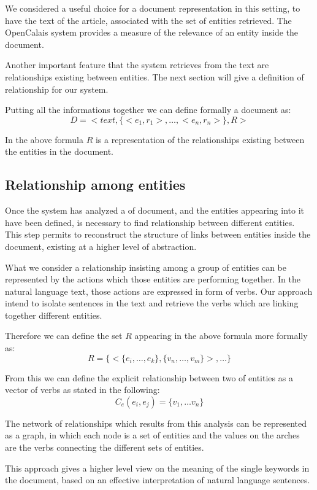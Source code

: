 \documentclass{acm_proc_article-sp-sigmod07}
\begin{document}
We considered a useful choice for a document representation in this
setting, to have the text of the article, associated with the set of
entities retrieved.
The OpenCalais system provides a measure of the relevance of an entity
inside the document.

Another important feature that the system retrieves from the text are
relationships existing between entities. The next section will give a
definition of relationship for our system.

Putting all the informations together we can define formally a document
as:
$$
D = <text, \{<e_{1},r_{1}>, \dots, <e_{n}, r_{n}>\}, R>
$$

In the above formula $R$ is a representation of the relationships
existing between the entities in the document.


\subsection{Relationship among entities}
Once the system has analyzed a of document, and the entities
appearing into it have been defined, is necessary to find relationship
between different entities. This step permits to reconstruct the structure
of links between entities inside the document, existing at a
higher level of abstraction.

What we consider a relationship insisting among a group of entities can be
represented by the actions which those entities are performing together.
In the natural language text, those actions are expressed in form of
verbs. Our approach intend to isolate sentences in the text and retrieve
the verbs which are linking together different entities.

Therefore we can define the set $R$ appearing in the above formula more
formally as:
$$
R = \{ <\{e_{i}, \dots, e_{k}\}, \{v_{n}, \dots, v_{m}\}>, \dots \}
$$


From this we can define the explicit relationship between two of entities as a
vector of verbs as stated in the following:
$$
C_{e}(e_{i}, e_{j}) = \{v_{1}, \dots v_{n}\}
$$

The network of relationships which results from this analysis can be
represented as a graph, in which each node is a set of entities and the
values on the arches are the verbs connecting the different sets of
entities.

This approach gives a higher level view on the meaning of the single
keywords in the document, based on an effective interpretation of natural
language sentences.
\end{document}
